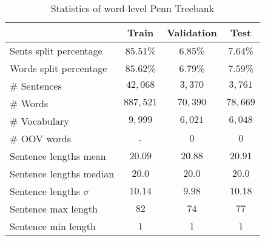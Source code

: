 \begin{table}
    \begin{center}
        \begin{tabular}{lccc}
        \toprule
            & Train & Validation & Test \\
            \midrule
            Sents split percentage & 
            \(85.51\)\% & \(6.85\)\% & \(7.64\)\%  \\
            Words split percentage & 
            \(85.62\)\% & \(6.79\)\% & \(7.59\)\%  \\
            \# Sentences & 
            \(42,068\) & \(3,370\) & \(3,761\) \\
            \# Words & 
            \(887,521\) & \(70,390\) & \(78,669\) \\ 
            \# Vocabulary & 
            \(9,999\) & \(6,021\) & \(6,048\) \\
            \# OOV words & 
            - & \(0\) & \(0\) \\
            \midrule
            Sentence lengths mean & 
            \(20.09\) & \(20.88\) & \(20.91\) \\
            Sentence lengths median & 
            \(20.0\) & \(20.0\) & \(20.0\) \\
            Sentence lengths \(\sigma\) &
            \(10.14\) & \(9.98\) & \(10.18\) \\
            Sentence max length & 
            \(82\) & \(74\) & \(77\) \\
            Sentence min length & 
            \(1\) & \(1\) & \(1\) \\
        
            \bottomrule
        \end{tabular}
    \end{center}
    \caption{Statistics of word-level Penn Treebank}
    \label{tab:statistics}
\end{table}